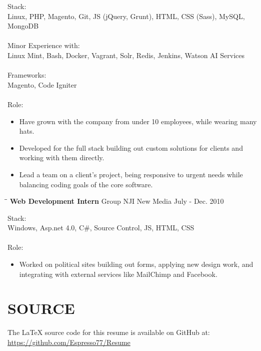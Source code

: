 \documentclass{res}
\begin{document}
\begin{resume}
    Stack: \\
	Linux, PHP, Magento, Git, JS (jQuery, Grunt), HTML, CSS (Sass), MySQL, MongoDB \\
	\\
	Minor Experience with: \\
	Linux Mint, Bash, Docker, Vagrant, Solr, Redis, Jenkins, Watson AI Services \\
	\\
	Frameworks: \\
	Magento, Code Igniter \\
	\\
	Role: \\
	\vspace{-0.15in}	
	\begin{itemize}
		\item Have grown with the company from under 10 employees, while wearing many hats.
		\item Developed for the full stack building out custom solutions for clients and working with them directly.
		\item Lead a team on a client's project, being responsive to urgent needs while balancing coding goals of the core software.
	\end{itemize}
    
   \begin{tabbing}
		\hspace{2.3in}\= \hspace{2.6in}\= \kill %
		\textbf{Web Development Intern} \>Group NJI New Media \> July - Dec. 2010 \\
   \end{tabbing}\vspace{-20pt}
   
    Stack: \\
	Windows, Asp.net 4.0, C\#, Source Control, JS, HTML, CSS \\
	\\
	Role: \\
	\vspace{-0.15in}
	\begin{itemize}
		\item Worked on political sites building out forms, applying new design work, and integrating with external services like MailChimp and Facebook.
	\end{itemize}
	
\section{SOURCE}
	The LaTeX source code for this resume is available on GitHub at: \\
	\url{https://github.com/Espresso77/Resume}
 
\end{resume}
\end{document}
